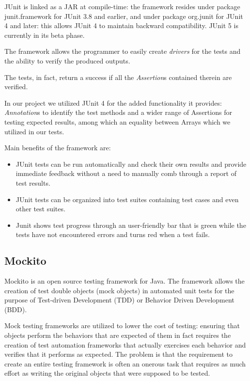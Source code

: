 \documentclass{beamer}
\begin{document}
JUnit is linked as a JAR at compile-time: the framework resides under package junit.framework for JUnit 3.8 and earlier, and under package org.junit for JUnit 4 and later: this allows JUnit 4 to maintain backward compatibility.
JUnit 5 is currently in its beta phase.

The framework allows the programmer to easily create \textit{drivers} for the tests and the ability to verify the produced outputs. 

The tests, in fact, return a success if all the \textit{Assertion}s contained therein are verified.

In our project we utilized JUnit 4 for the added functionality it provides: \textit{Annotation}s to identify the test methods and a wider range of Assertions for testing expected results, among which an equality between Arrays which we utilized in our tests.

Main benefits of the framework are: \begin{itemize}
	\item JUnit tests can be run automatically and check their own results and provide immediate feedback without a need to manually comb through a report of test results.
	
	\item JUnit tests can be organized into test suites containing test cases and even other test suites.
	
	\item Junit shows test progress through an user-friendly bar that is green while the tests have not encountered errors and turns red when a test fails.
	
\end{itemize}


\subsection{Mockito}

Mockito is an open source testing framework for Java. The framework allows the creation of test double objects (mock objects) in automated unit tests for the purpose of Test-driven Development (TDD) or Behavior Driven Development (BDD).

Mock testing frameworks are utilized to lower the cost of testing: ensuring that objects perform the behaviors that are expected of them in fact requires the creation of test automation frameworks that actually exercises each behavior and verifies that it performs as expected. The problem is that the requirement to create an entire testing framework is often an onerous task that requires as much effort as writing the original objects that were supposed to be tested. 
\end{document}
